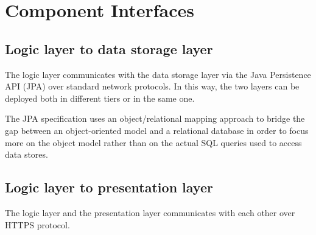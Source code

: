\section{Component Interfaces}

\subsection{Logic layer to data storage layer}
The logic layer communicates with the data storage layer via the Java Persistence API (JPA) over standard network protocols.
In this way, the two layers can be deployed both in different tiers or in the same one.

The JPA specification uses an object/relational mapping approach to bridge the gap between an object-oriented model and a relational database in order to focus more on the object model rather than on the actual SQL queries used to access data stores.

\subsection{Logic layer to presentation layer}

The logic layer and the presentation layer communicates with each other over HTTPS protocol. %

